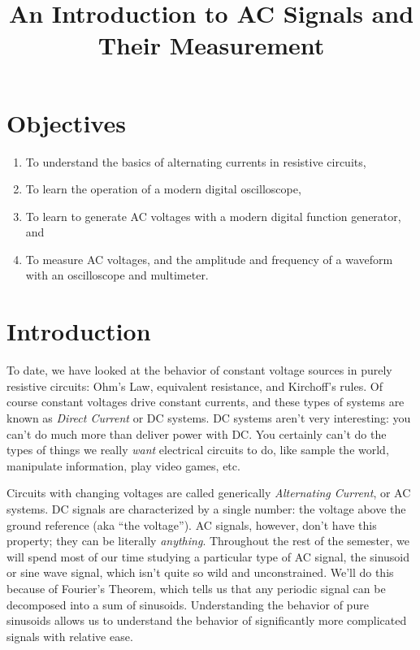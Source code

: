 \documentclass[12pt]{article}
\title{An Introduction to AC Signals and Their Measurement}
\author{}
\date{}
\begin{document}
\maketitle

\section{Objectives}
\label{sec:objectives}

\begin{enumerate}
\item To understand the basics of alternating currents in resistive
  circuits,
\item To learn the operation of a modern digital oscilloscope,
\item To learn to generate AC voltages with a modern digital function
  generator, and
\item To measure AC voltages, and the amplitude and frequency
  of a waveform with an oscilloscope and multimeter.
\end{enumerate}

\section{Introduction}
\label{sec:introduction}

To date, we have looked at the behavior of constant voltage sources in
purely resistive circuits: Ohm's Law, equivalent resistance, and
Kirchoff's rules.  Of course constant voltages drive constant
currents, and these types of systems are known as \textit{Direct
  Current} or DC systems.  DC systems aren't very interesting: you
can't do much more than deliver power with DC.  You certainly can't do
the types of things we really \textit{want} electrical circuits to do,
like sample the world, manipulate information, play video games, etc.

Circuits with changing voltages are called generically
\textit{Alternating Current}, or AC systems.  DC signals are
characterized by a single number: the voltage above the ground
reference (aka ``the voltage'').  AC signals, however, don't have this
property; they can be literally \textit{anything}.  Throughout the
rest of the semester, we will spend most of our time studying a
particular type of AC signal, the sinusoid or sine wave signal, which
isn't quite so wild and unconstrained.  We'll do this because of
Fourier's Theorem, which tells us that any periodic signal can be
decomposed into a sum of sinusoids.  Understanding the behavior of
pure sinusoids allows us to understand the behavior of significantly
more complicated signals with relative ease.
\end{document}
